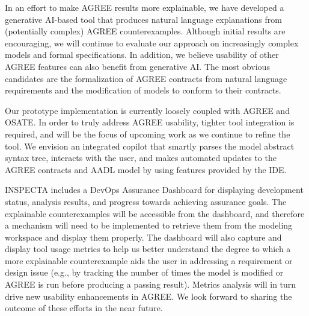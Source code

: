 
In an effort to make AGREE results more explainable, we have developed a generative AI-based tool that produces natural language explanations from (potentially complex) AGREE counterexamples. 
%
%
Although initial results are encouraging, we will continue to evaluate our approach on increasingly complex models and formal specifications.  In addition, we believe usability of other AGREE features can also benefit from generative AI.  The most obvious candidates are the formalization of AGREE contracts from natural language requirements and the modification of models to conform to their contracts.   

Our prototype implementation is currently loosely coupled with AGREE and OSATE.  In order to truly address AGREE usability, tighter tool integration is required, and will be the focus of upcoming work as we continue to refine the tool.  We envision an integrated copilot that smartly parses the model abstract syntax tree, interacts with the user, and makes automated updates to the AGREE contracts and AADL model by using features provided by the IDE.

INSPECTA includes a DevOps Assurance Dashboard for displaying development status, analysis results, and progress towards achieving assurance goals.  The explainable counterexamples will be accessible from the dashboard, and therefore a mechanism will need to be implemented to retrieve them from the modeling workspace and display them properly.
The dashboard will also capture and display tool usage metrics to help us better understand the degree to which a more explainable counterexample aids the user in addressing a requirement or design issue (e.g., by tracking the number of times the model is modified or AGREE is run before producing a passing result). Metrics analysis will in turn drive new usability enhancements in AGREE.
%
We look forward to sharing the outcome of these efforts in the near future.